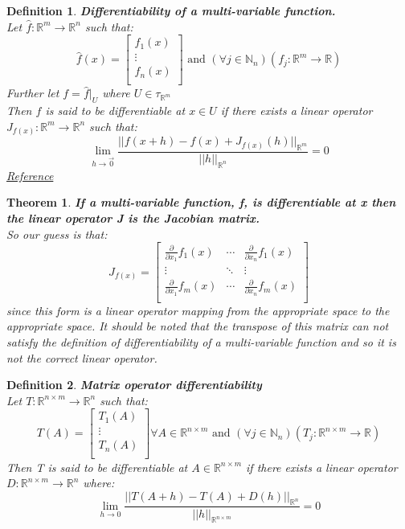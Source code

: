\documentclass[12pt]{extarticle}
\theoremstyle{plain}
\newtheorem{thm}{Theorem}[section]
\theoremstyle{plain}
\theoremstyle{Definition}
\newtheorem{def.}{Definition}[section]
\theoremstyle{Definition}
\theoremstyle{plain}
\begin{document}
\newpage
\begin{def.} \textbf{Differentiability of a multi-variable function.} \\
	Let $\hat{f} : \mathbb{R}^m \to \mathbb{R}^n$ such that: \\ 
	\[
	\hat{f}(x) = 
	\begin{bmatrix}
	f_1(x) \\ 
	\vdots \\
	f_n(x) \\
	\end{bmatrix}
	\text{ and } 
	(\forall j \in \mathbb{N}_n)(f_j : \mathbb{R}^m \to \mathbb{R})
	\]
	Further let $f = \hat{f}|_U$ where $U \in \tau_{\mathbb{R}^m}$ \\ 
	Then $f$ is said to be differentiable at $x \in U$ if there exists a linear operator $J_{f(x)}: \mathbb{R}^m \to \mathbb{R}^n$ such that: \\ 
	$$\lim_{h \to \vec{0}} \frac{||f(x + h) - f(x) + J_{f(x)}(h)||_{\mathbb{R}^m}}{||h||_{\mathbb{R}^n}} = 0$$
	\href{https://en.wikipedia.org/wiki/Differentiable_function}{Reference}
\end{def.}
\begin{thm} \textbf{If a multi-variable function, f, is differentiable at x then the linear operator J is the Jacobian matrix.} \\ 
	So our guess is that: \\ 
	\[
	J_{f(x)} = 
	\begin{bmatrix}
	\frac{\partial}{\partial x_1} f_1(x) & \cdots & \frac{\partial}{\partial x_n} f_1(x) \\ 
	\vdots & \ddots & \vdots \\ 
	\frac{\partial}{\partial x_1} f_m(x) & \cdots & \frac{\partial}{\partial x_n} f_m(x) \\ 
	\end{bmatrix}
	\]
	since this form is a linear operator mapping from the appropriate space to the appropriate space. It should be noted that the transpose of this matrix can not satisfy the definition of differentiability of a multi-variable function and so it is not the correct linear operator. 
\end{thm}
\begin{def.} \textbf{Matrix operator differentiability} \\ 
	Let $T : \mathbb{R}^{n\times m} \to \mathbb{R}^n$ such that: \\
	\[
	T(A) = 
	\begin{bmatrix}
	T_1(A) \\ 
	\vdots \\ 
	T_n(A) \\ 	
	\end{bmatrix}
	\forall A \in \mathbb{R}^{n\times m}
	\text{ and } (\forall j \in \mathbb{N}_n)(T_j : \mathbb{R}^{n \times m} \to \mathbb{R})
	\]
	Then T is said to be differentiable at $A \in \mathbb{R}^{n \times m}$ if there exists a linear operator $D : \mathbb{R}^{n \times m} \to \mathbb{R}^n$ where: \\ 
	$$\lim_{h \to 0} \frac{||T(A + h) - T(A) + D(h)||_{\mathbb{R}^n}}{||h||_{\mathbb{R}^{n\times m}}} = 0$$
\end{def.}
\end{document}
